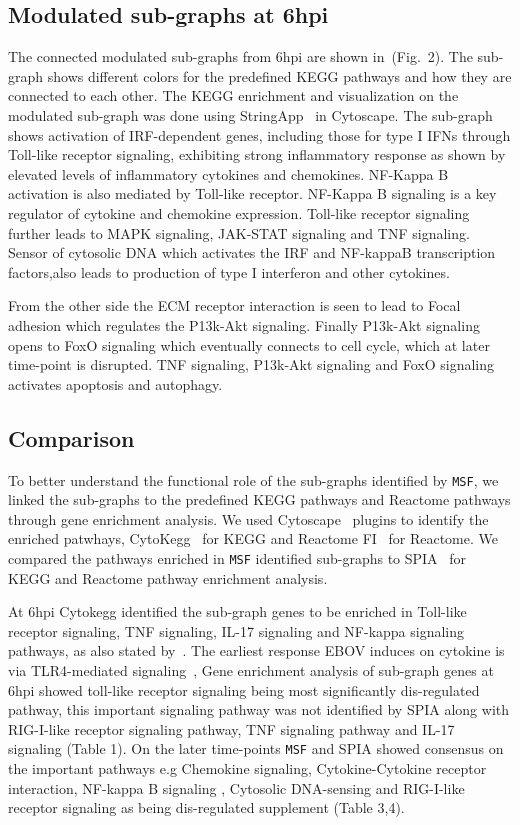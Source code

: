 \documentclass[twocolumn]{article}
\begin{document}
\subsection*{Modulated sub-graphs at 6hpi}

 The connected modulated sub-graphs from 6hpi are shown in~(Fig.~2). The sub-graph shows different colors for the predefined KEGG pathways and how they are connected to each other. The KEGG enrichment and visualization on the modulated sub-graph was done using StringApp~\cite{StringApp} in Cytoscape. The sub-graph shows activation of IRF-dependent genes, including those for type I IFNs through Toll-like receptor signaling, exhibiting strong inflammatory response as shown by elevated levels of inflammatory cytokines and chemokines. NF-Kappa B activation is also mediated by Toll-like receptor. NF-Kappa B signaling is a key regulator of cytokine and chemokine expression. Toll-like receptor signaling further leads to  MAPK signaling, JAK-STAT signaling and TNF signaling. Sensor of cytosolic DNA which activates the IRF and NF-{kappa}B transcription factors,also leads to production of type I interferon and other cytokines. 
 
 From the other side the ECM receptor interaction is seen to lead to Focal adhesion which regulates the P13k-Akt signaling. Finally P13k-Akt signaling opens to FoxO signaling which eventually connects to cell cycle, which at later time-point is disrupted. TNF signaling, P13k-Akt signaling and FoxO signaling activates apoptosis and autophagy.

 

\subsection*{Comparison} 

To better understand the functional role of the sub-graphs identified by \texttt{MSF}, we linked the  sub-graphs to the predefined KEGG pathways and Reactome
pathways through gene enrichment analysis. We used Cytoscape~\cite{Cyto} plugins to identify the enriched patwhays, CytoKegg~\cite{Cytokegg} for KEGG and Reactome FI~\cite{Reactome} for Reactome. We compared the pathways enriched in \texttt{MSF} identified sub-graphs to SPIA~\cite{Tarca} for KEGG and Reactome pathway enrichment analysis. 

At 6hpi Cytokegg identified the sub-graph genes to be enriched in Toll-like receptor signaling, TNF signaling, IL-17 signaling and NF-kappa signaling pathways, as also stated by~\cite{Olejnik}. The earliest response EBOV induces on  cytokine is via TLR4-mediated signaling~\cite{Olejnik}, Gene enrichment analysis of sub-graph genes at 6hpi showed toll-like receptor signaling being most significantly dis-regulated pathway, this important signaling pathway was not identified by SPIA along with RIG-I-like receptor signaling pathway, TNF signaling pathway and IL-17 signaling (Table 1). 
On the later time-points \texttt{MSF} and SPIA showed consensus on the important pathways e.g Chemokine signaling, Cytokine-Cytokine receptor interaction, NF-kappa B signaling , Cytosolic DNA-sensing and RIG-I-like receptor signaling as being dis-regulated supplement (Table 3,4). 
\end{document}
